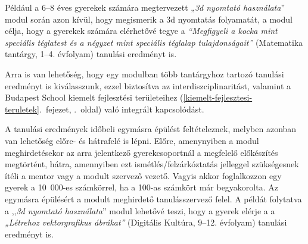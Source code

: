 Például a 6--8 éves gyerekek számára megtervezett „\emph{3d nyomtató
használata}'' modul során azon kívül, hogy megismerik a 3d nyomtatás
folyamatát, a modul célja, hogy a gyerekek számára elérhetővé tegye a
\emph{``Megfigyeli a kocka mint speciális téglatest és a négyzet mint
speciális téglalap tulajdonságait''} (Matematika tantárgy, 1--4.
évfolyam) tanulási eredményt is.

Arra is van lehetőség, hogy egy modulban több tantárgyhoz tartozó
tanulási eredményt is kiválasszunk, ezzel biztosítva az interdiszciplinaritást, valamint a
Budapest School
kiemelt fejlesztési területeihez (\ref{kiemelt-fejlesztesi-teruletek}.~fejezet, \pageref{kiemelt-fejlesztesi-teruletek}.~oldal)
való integrált kapcsolódást.

A tanulási eredmények időbeli egymásra épülést feltételeznek,
melyben azonban van lehetőség előre- és hátrafelé is lépni. Előre,
amenynyiben a modul meghirdetésekor az arra jelentkező gyerekcsoportnál
a megfelelő előkészítés megtörtént, hátra, amennyiben ezt
ismétlés\slash felzárkóztatás jelleggel szükségesnek ítéli a mentor vagy a
modult szervező vezető. Vagyis akkor foglalkozzon egy gyerek a
10~000-es számkörrel, ha a 100-as számkört már begyakorolta. Az egymásra
épülésért a modult meghirdető tanulásszervező felel. A példát folytatva
a ,,\emph{3d nyomtató használata}'' modul lehetővé teszi, hogy a gyerek elérje a a
\emph{„Létrehoz vektorgrafikus ábrákat''} (Digitális Kultúra, 9--12.
évfolyam) tanulási eredményt is.

